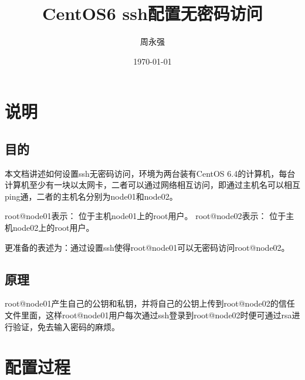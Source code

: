\documentclass[a4paper]{article}
\title{CentOS6 ssh配置无密码访问} %
\author{周永强} %
\date{\today} %
\begin{document}
\maketitle %

\section{说明} %

\subsection{目的} %
本文档讲述如何设置ssh无密码访问，环境为两台装有CentOS 6.4的计算机，每台计算机至少有一块以太网卡，二者可以通过网络相互访问，即通过主机名可以相互ping通，二者的主机名分别为node01和node02。
\begin{pyglist}[language=bash]
   root@node01表示： 位于主机node01上的root用户。
   root@node02表示： 位于主机node02上的root用户。
\end{pyglist}
更准备的表述为：通过设置ssh使得root@node01可以无密码访问root@node02。

\subsection{原理} %
root@node01产生自己的公钥和私钥，并将自己的公钥上传到root@node02的信任文件里面，这样root@node01用户每次通过ssh登录到root@node02时便可通过rsa进行验证，免去输入密码的麻烦。

\section{配置过程} %
\end{document}
